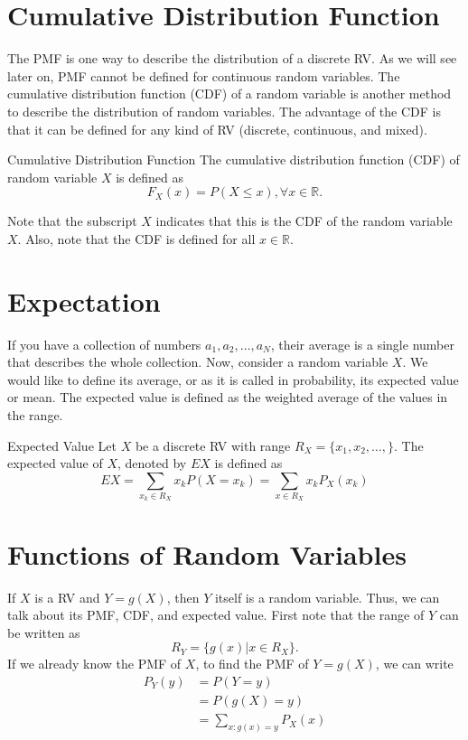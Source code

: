 \section{Cumulative Distribution Function}
\label{sec:cdf}
The PMF is one way to describe the distribution of a discrete RV. As we will see later on, PMF cannot be defined for continuous random variables. The cumulative distribution function (CDF) of a random variable is another method to describe the distribution of random variables. The advantage of the CDF is that it can be defined for any kind of RV (discrete, continuous, and mixed).

\begin{definition}{Cumulative Distribution Function}
	The cumulative distribution function (CDF) of random variable $X$ is defined as 
	$$F_X(x) = P(X\leq x), \forall x\in\mathbb{R}.$$
\end{definition}
Note that the subscript $X$ indicates that this is the CDF of the random variable $X$. Also, note that the CDF is defined for all $x\in \mathbb{R}$. 

\section{Expectation}
If you have a collection of numbers $a_1,a_2,\dots,a_N$, their average is a single number that describes the whole collection. Now, consider a random variable $X$. We would like to define its average, or as it is called in probability, its expected value or mean. The expected value is defined as the weighted average of the values in the range.

\begin{definition}{Expected Value}
	Let $X$ be a discrete RV with range $R_X = \{x_1,x_2,\dots,\}$. The expected value of $X$, denoted by $EX$ is defined as
	$$EX = \sum_{x_k\in R_X}x_kP(X=x_k) = \sum_{x\in R_X}x_kP_X(x_k)$$
\end{definition}

\section{Functions of Random Variables}
If $X$ is a RV and $Y=g(X)$, then $Y$ itself is a random variable. Thus, we can talk about its PMF, CDF, and expected value. First note that the range of $Y$ can be written as 
$$R_Y = \{g(x)|x\in R_X\}.$$
If we already know the PMF of $X$, to find the PMF of $Y=g(X)$, we can write
\begin{align*}
	P_Y(y) &= P(Y=y)\\
		   &= P(g(X)=y)\\
		   &= \sum_{x:g(x)=y}P_X(x)
\end{align*}

